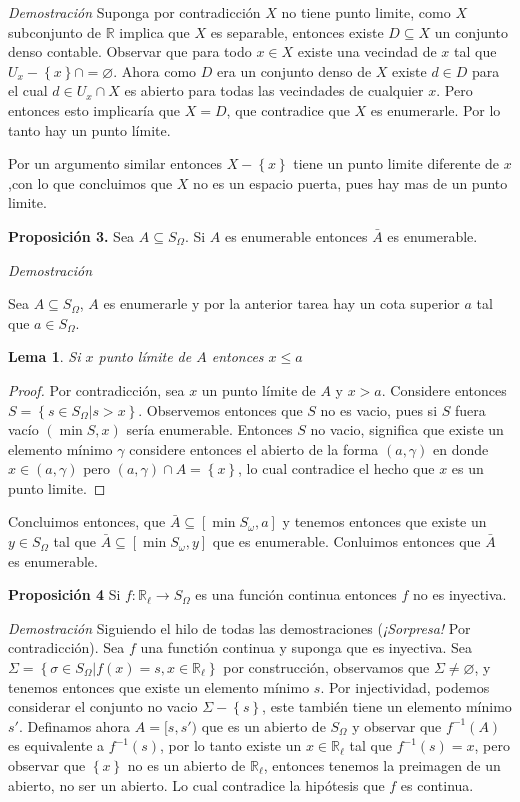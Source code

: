 \documentclass[]{article}
\newtheorem{lem}{Lema}
\newcommand{\set}[1]{\left\lbrace #1 \right\rbrace}
\newcommand{\RR}{\mathbb{R}}
\newcommand{\contained}{\subseteq}
\begin{document}
\textit{Demostración}
Suponga por contradicción $X$ no tiene punto limite, como   $X$ subconjunto de $\RR$ implica que $X$ es separable, entonces existe $D \contained X$ un conjunto denso contable. Observar que para todo $x \in X$ existe una vecindad de $x$ tal que $U_x - \set{x} \cap = \varnothing $. Ahora como $D$ era un conjunto denso de $X$ existe $d \in D$ para el cual $ d \in U_x \cap X  $ es abierto para todas las vecindades de cualquier $x$. Pero entonces esto implicaría que $X=D$, que contradice que $X$ es enumerarle. Por lo tanto hay un punto límite. \qedsymbol

Por un argumento similar entonces $X - \set{x}$ tiene un punto limite diferente de $x$,con lo que concluimos que $X$ no es un espacio puerta, pues hay mas de un punto limite.

\textbf{Proposición 3.} Sea $A\subseteq S_\Omega$. Si $A$ es enumerable entonces $\bar{A}$ es enumerable.

\textit{Demostración}

Sea $A \contained S_\Omega$, $A$ es enumerarle y por la anterior tarea hay un cota superior  $a$ tal que  $ a \in S_\Omega$.

\begin{lem}
	Si $x$ punto límite de $A$ entonces $ x \leq a$
\end{lem} 
\begin{proof}
	Por contradicción, sea $x$ un punto límite de $A$ y $x >a$. Considere entonces $ S = \set{s \in S_\Omega | s>x} $. Observemos entonces que $S$ no es vacio, pues si $S$ fuera vacío $ (\operatorname{min}S,x) $ sería enumerable. Entonces $S$ no vacio, significa que existe un elemento mínimo $ \gamma $ considere entonces el abierto de la forma $ (a, \gamma) $ en donde $ x \in (a, \gamma) $ pero $ (a, \gamma) \cap A = \set{x} $, lo cual contradice el hecho que $x$ es un punto limite. 
\end{proof}

Concluimos entonces, que $ \bar{A} \contained [\operatorname{min}S_{\omega}, a] $ y tenemos entonces que existe un $y \in S_\Omega$ tal que  $ \bar{A} \contained [\operatorname{min}S_{\omega}, y] $ que es enumerable. Conluimos entonces que $\bar{A}$ es enumerable.

\textbf{Proposición 4} Si $f:\mathbb{R}_\ell \rightarrow S_\Omega$ es una función continua entonces $f$ no es inyectiva.

\textit{Demostración}
Siguiendo el hilo de todas las demostraciones (\emph{¡Sorpresa!} Por contradicción). Sea $f$ una functión continua y suponga que es inyectiva. Sea $ \Sigma =\set{\sigma \in S_\Omega| f(x) = s, x \in \RR_\ell}  $ por construcción, observamos que $ \Sigma \neq \varnothing$, y tenemos entonces que existe un elemento mínimo $s$. Por injectividad, podemos considerar el conjunto no vacio $ \Sigma - \set{s} $, este también tiene un elemento mínimo $s'$. Definamos ahora $A = [s,s') $ que es un abierto de $ S_\Omega $ y observar que $ f^{-1}(A) $ es equivalente a $ f^{-1}(s) $, por lo tanto existe un $x \in \RR_\ell $ tal que $ f^{-1}(s) = x $, pero observar que $ \set{x} $ no es un abierto de $\RR_\ell$, entonces tenemos la preimagen de un abierto, no ser un abierto. Lo cual contradice la hipótesis que $f$ es continua. \qedsymbol
\end{document}
